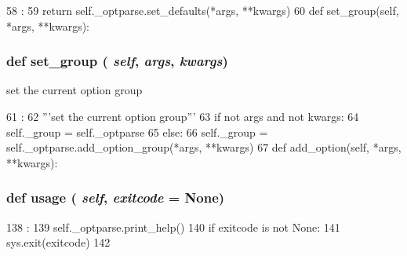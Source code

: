 \begin{DoxyCode}
58                                            :
59         return self._optparse.set_defaults(*args, **kwargs)
60 
    def set_group(self, *args, **kwargs):
\end{DoxyCode}
\hypertarget{classm5_1_1options_1_1OptionParser_ab4033883235607d1e45958dbd9499355}{
\subsubsection[{set\_\-group}]{\setlength{\rightskip}{0pt plus 5cm}def set\_\-group ( {\em self}, \/   {\em args}, \/   {\em kwargs})}}
\label{classm5_1_1options_1_1OptionParser_ab4033883235607d1e45958dbd9499355}
\begin{DoxyVerb}set the current option group\end{DoxyVerb}
 


\begin{DoxyCode}
61                                         :
62         '''set the current option group'''
63         if not args and not kwargs:
64             self._group = self._optparse
65         else:
66             self._group = self._optparse.add_option_group(*args, **kwargs)
67 
    def add_option(self, *args, **kwargs):
\end{DoxyCode}
\hypertarget{classm5_1_1options_1_1OptionParser_af67d40fcc793c85ca5ce6063d65256c1}{
\subsubsection[{usage}]{\setlength{\rightskip}{0pt plus 5cm}def usage ( {\em self}, \/   {\em exitcode} = {\ttfamily None})}}
\label{classm5_1_1options_1_1OptionParser_af67d40fcc793c85ca5ce6063d65256c1}



\begin{DoxyCode}
138                                   :
139         self._optparse.print_help()
140         if exitcode is not None:
141             sys.exit(exitcode)
142 

\end{DoxyCode}


